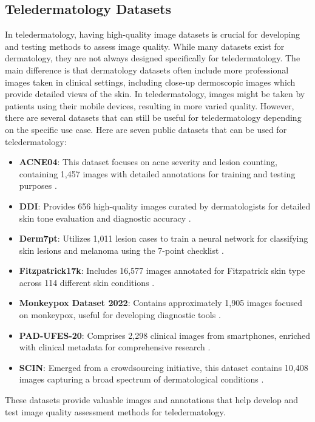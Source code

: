 \subsection{Teledermatology Datasets}
\label{sub:DatasetsTD}
In teledermatology, having high-quality image datasets is crucial for developing and testing methods to assess image quality. While many datasets exist for dermatology, they are not always designed specifically for teledermatology. The main difference is that dermatology datasets often include more professional images taken in clinical settings, including close-up dermoscopic images which provide detailed views of the skin. In teledermatology, images might be taken by patients using their mobile devices, resulting in more varied quality. However, there are several datasets that can still be useful for teledermatology depending on the specific use case. Here are seven public datasets that can be used for teledermatology: \par
\begin{itemize}
    \item \textbf{ACNE04}: This dataset focuses on acne severity and lesion counting, containing 1,457 images with detailed annotations for training and testing purposes \autocite{ACNE04}.
    \item \textbf{DDI}: Provides 656 high-quality images curated by dermatologists for detailed skin tone evaluation and diagnostic accuracy \autocite{DDI}.
    \item \textbf{Derm7pt}: Utilizes 1,011 lesion cases to train a neural network for classifying skin lesions and melanoma using the 7-point checklist \autocite{Derm7pt}.
    \item \textbf{Fitzpatrick17k}: Includes 16,577 images annotated for Fitzpatrick skin type across 114 different skin conditions \autocite{F17K}.
    \item \textbf{Monkeypox Dataset 2022}: Contains approximately 1,905 images focused on monkeypox, useful for developing diagnostic tools \autocite{Monkeypox}.
    \item \textbf{PAD-UFES-20}: Comprises 2,298 clinical images from smartphones, enriched with clinical metadata for comprehensive research \autocite{PAD-UFES-20}.
    \item \textbf{SCIN}: Emerged from a crowdsourcing initiative, this dataset contains 10,408 images capturing a broad spectrum of dermatological conditions \autocite{SCIN}.
\end{itemize}
\noindent
These datasets provide valuable images and annotations that help develop and test image quality assessment methods for teledermatology. \par 

